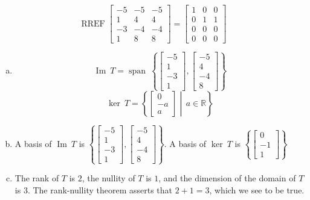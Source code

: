 \begin{exerciseAnswer} 


\[\operatorname{RREF} \left[\begin{array}{ccc}
-5 & -5 & -5 \\
1 & 4 & 4 \\
-3 & -4 & -4 \\
1 & 8 & 8
\end{array}\right] = \left[\begin{array}{ccc}
1 & 0 & 0 \\
0 & 1 & 1 \\
0 & 0 & 0 \\
0 & 0 & 0
\end{array}\right] \]


\begin{enumerate}[(a)]
\item \[\operatorname{Im}\ T = \operatorname{span}\  \left\{ \left[\begin{array}{c}
-5 \\
1 \\
-3 \\
1
\end{array}\right] , \left[\begin{array}{c}
-5 \\
4 \\
-4 \\
8
\end{array}\right] \right\} \]\[\operatorname{ker}\ T =  \left\{ \left[\begin{array}{c}
0 \\
-a \\
a
\end{array}\right] \middle|\,a\in\mathbb{R}\right\} \]
\item  A basis of \(\operatorname{Im}\ T\) is \( \left\{ \left[\begin{array}{c}
-5 \\
1 \\
-3 \\
1
\end{array}\right] , \left[\begin{array}{c}
-5 \\
4 \\
-4 \\
8
\end{array}\right] \right\} \). A basis of \(\operatorname{ker}\ T\) is \( \left\{ \left[\begin{array}{c}
0 \\
-1 \\
1
\end{array}\right] \right\} \)
\item  The rank of \(T\) is \( 2 \), the nullity of \(T\) is \( 1 \), and the dimension of the domain of \(T\) is \( 3 \). The rank-nullity theorem asserts that \( 2 + 1 = 3 \), which we see to be true. 
\end{enumerate}
    
\end{exerciseAnswer}
    
